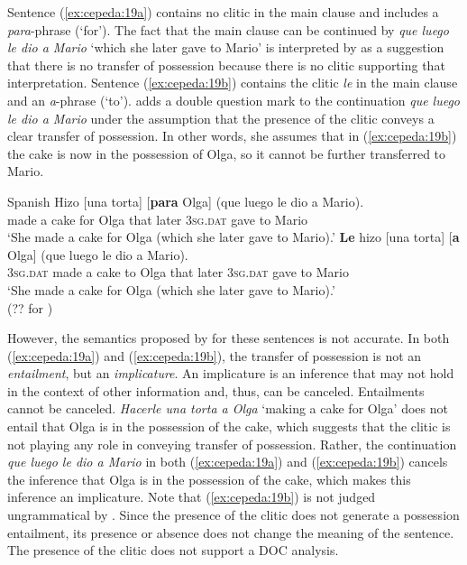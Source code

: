 \documentclass[output=paper,colorlinks,citecolor=brown,modfonts,nonflat]{langsci/langscibook}
\begin{document}
Sentence (\ref{ex:cepeda:19a}) contains no clitic in the main clause and includes a \textit{para}-phrase (‘for’). The fact that the main clause can be continued by \textit{que luego le dio a Mario} ‘which she later gave to Mario’ is interpreted by \citeauthor{Demonte1995} as a suggestion that there is no transfer of possession because there is no clitic supporting that interpretation. Sentence (\ref{ex:cepeda:19b}) contains the clitic \textit{le} in the main clause and an \textit{a}-phrase (‘to’). \citeauthor{Demonte1995} adds a double question mark to the continuation \textit{que luego le dio a Mario} under the assumption that the presence of the clitic conveys a clear transfer of possession. In other words, she assumes that in (\ref{ex:cepeda:19b}) the cake is now in the possession of Olga, so it cannot be further transferred to Mario.

\ea%
    \label{ex:cepeda:19}
    Spanish
	\ea\label{ex:cepeda:19a}
	\gll Hizo [una torta] [\textbf{para} Olga] (que luego le   dio   a  Mario).\\
		made \hspaceThis{[}a cake \hspaceThis{[}for Olga that  later \textsc{3sg.dat} gave to Mario\\
	\glt ‘She made a cake for Olga (which she later gave to Mario).’
	\ex\label{ex:cepeda:19b}
	\gll  \textbf{Le}  hizo [una torta] [\textbf{a}  Olga] (que luego le  dio    a  Mario).\\
		\textsc{3sg.dat} made \hspaceThis{[}a cake \hspaceThis{[}to Olga that  later \textsc{3sg.dat} gave to Mario\\
	\glt ‘She made a cake for Olga (which she later gave to Mario).’\\
			(?? for \citeauthor{Demonte1995})
	\z
\z

However, the semantics proposed by \citeauthor{Demonte1995} for these sentences is not accurate. In both (\ref{ex:cepeda:19a}) and (\ref{ex:cepeda:19b}), the transfer of possession is not an \textit{entailment}, but an \textit{implicature}. An implicature is an inference that may not hold in the context of other information and, thus, can be canceled. Entailments cannot be canceled. \textit{Hacerle una torta a Olga} ‘making a cake for Olga’ does not entail that Olga is in the possession of the cake, which suggests that the clitic is not playing any role in conveying transfer of possession. Rather, the continuation \textit{que luego le dio a Mario} in both (\ref{ex:cepeda:19a}) and (\ref{ex:cepeda:19b}) cancels the inference that Olga is in the possession of the cake, which makes this inference an implicature. Note that (\ref{ex:cepeda:19b}) is not judged ungrammatical by \citeauthor{Demonte1995}. Since the presence of the clitic does not generate a possession entailment, its presence or absence does not change the meaning of the sentence. The presence of the clitic does not support a DOC analysis.
\end{document}

